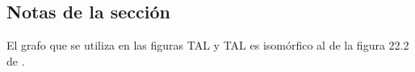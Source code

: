 \subsection*{Notas de la sección}

El grafo que se utiliza en las figuras TAL y TAL es isomórfico al de la figura 22.2 de \textcite{cormen}.